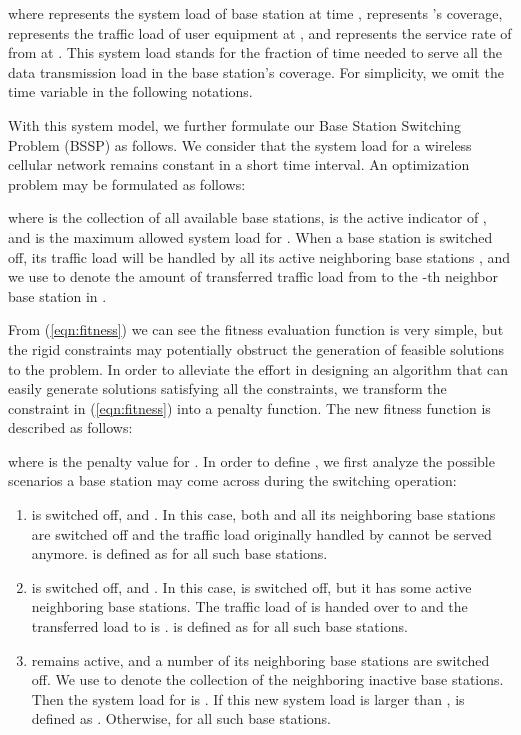 \documentclass[conference]{IEEEtran}
\begin{document}
where  represents the system load of base station  at time ,  represents 's coverage,  represents the traffic load of user equipment  at , and  represents the service rate of  from  at . This system load stands for the fraction of time needed to serve all the data transmission load in the base station's coverage. For simplicity, we omit the time variable in the following notations.

With this system model, we further formulate our Base Station Switching Problem (BSSP) as follows. We consider that the system load for a wireless cellular network remains constant in a short time interval. An optimization problem may be  formulated as follows:

where  is the collection of all available base stations,  is the active indicator of , and  is the maximum allowed system load for . When a base station  is switched off, its traffic load will be handled by all its active neighboring base stations , and we use  to denote the amount of transferred traffic load from  to the -th neighbor base station in .

From (\ref{eqn:fitness}) we can see the fitness evaluation function is very simple, but the rigid constraints may potentially obstruct the generation of feasible solutions to the problem. In order to alleviate the effort in designing an algorithm that can easily generate solutions satisfying all the constraints, we transform the constraint in (\ref{eqn:fitness}) into a penalty function. The new fitness function is described as follows:

where  is the penalty value for . In order to define , we first analyze the possible scenarios a base station may come across during the switching operation:
\begin{enumerate}
\item  is switched off, and . In this case, both  and all its neighboring base stations are switched off and the traffic load originally handled by  cannot be served anymore.  is defined as  for all such base stations.
\item  is switched off, and . In this case,  is switched off, but it has some active neighboring base stations. The traffic load of  is handed over to  and the transferred load to  is .  is defined as  for all such base stations.
\item  remains active, and a number of its neighboring base stations are switched off. We use  to denote the collection of the neighboring inactive base stations. Then the system load for  is . If this new system load is larger than ,  is defined as . Otherwise,  for all such base stations.
\end{enumerate}
\end{document}
